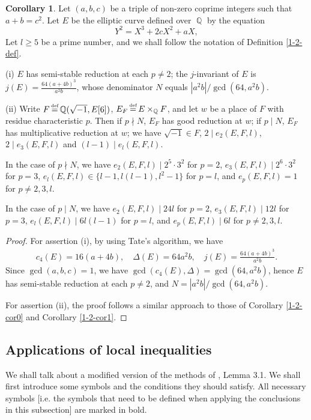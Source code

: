 \documentclass[a4paper, 12pt]{article}
\DeclareMathOperator{\defeq}{\overset{\text{\tiny{def}}}{=}}
\DeclareMathOperator{\Q}{\mathbb{Q}}
\numberwithin{equation}{section}
\theoremstyle{definition}
\newtheorem{cor}[thm]{Corollary}
\begin{document}
\begin{cor} \label{1-2-cor4}
Let $(a,b,c)$ be a triple of non-zero coprime integers such that $a + b = c^2$.
Let $E$ be the elliptic curve defined over $\Q$ by the equation 
$$Y^2 = X^3 + 2cX^2 + aX,$$
Let $l\ge 5$ be a prime number, and we shall follow the notation of Definition \ref{1-2-def}.

(i) $E$ has semi-stable reduction at each $p\neq 2$;
the $j$-invariant of $E$ is $ j(E) = \frac{64 (a+4b)^3}{a^2 b}$,
whose denominator $N$ equals $|a^2 b| / \gcd(64, a^2 b)$.

(ii) Write $F\defeq \Q(\sqrt{-1}, E[6])$, $E_F \defeq E\times_{\Q} F$, and let $w$ be a place of $F$ with residue characteristic $p$. 
Then if $p \nmid N$, $E_F$ has good reduction at $w$; if $p \mid N$, $E_F$ has multiplicative reduction at $w$; we have $\sqrt{-1} \in F$, $2\mid e_2(E,F,l)$, $2\mid e_3(E,F,l)$ and $(l-1) \mid e_l(E,F,l)$.

In the case of $p \nmid N$, we have 
$e_2(E,F,l) \mid 2^5 \cdot 3^2$ for $p=2$, $e_3(E,F,l) \mid 2^6 \cdot 3^2$ for $p=3$, 
$e_l(E,F,l) \in \{l-1, l(l-1), l^2-1\}$ for $p=l$, and $e_p(E,F,l) = 1$ for $p\neq 2,3,l$.
 
In the case of $p \mid N$, we have
$e_2(E,F,l) \mid 24 l$ for $p=2$, $e_3(E,F,l) \mid 12 l$ for $p=3$, 
$e_l(E,F,l) \mid 6 l (l-1)$ for $p=l$, 
and $e_p(E,F,l) \mid 6 l$ for $p\neq 2,3,l$.
\end{cor}
\begin{proof}
For assertion (i), by using Tate's algorithm, we have 
\small\begin{align*}
c_4(E) = 16 (a+4b), \quad
\Delta(E) = 64 a^2 b, \quad 
j(E) = \frac{64 (a+4b)^3}{a^2 b}.
\end{align*}\normalsize
Since $\gcd(a,b,c) = 1$, we have $\gcd(c_4(E), \Delta) = \gcd(64, a^2 b)$, hence $E$ has semi-stable reduction at each $p\neq 2$, and $N = | a^2 b |/\gcd(64,  a^2 b)$.

For assertion (ii), the proof follows a similar approach to those of Corollary \ref{1-2-cor0} and Corollary \ref{1-2-cor1}.
\end{proof}


\subsection{Applications of local inequalities}
We shall talk about a modified version of the methods of \cite{Diophantine_after_IUT_I}, Lemma 3.1.
We shall first introduce some symbols and the conditions they should satisfy.
All necessary symbols [i.e. the symbols that need to be defined when applying the conclusions in this subsection] are marked in bold.
 
\end{document}
